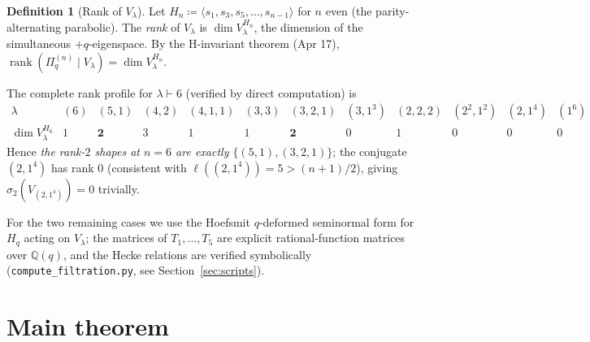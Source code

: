 \documentclass[11pt]{article}
\theoremstyle{plain}
\theoremstyle{definition}
\newtheorem{definition}[theorem]{Definition}
\theoremstyle{remark}
\newcommand{\Q}{\mathbb{Q}}
\newcommand{\Hq}{H_q}
\newcommand{\Pibs}{\Pi_q}
\begin{document}
\begin{definition}[Rank of $V_\lambda$]
Let $H_n \coloneqq \langle s_1,s_3,s_5,\ldots,s_{n-1}\rangle$ for $n$ even
(the parity-alternating parabolic). The \emph{rank} of $V_\lambda$ is
$\dim V_\lambda^{H_n}$, the dimension of the simultaneous $+q$-eigenspace.
By the H-invariant theorem (Apr 17), $\operatorname{rank}(\Pibs^{(n)} \mid V_\lambda) = \dim V_\lambda^{H_n}$.
\end{definition}

The complete rank profile for $\lambda \vdash 6$ (verified by direct
computation) is
\[
\begin{array}{c|ccccccccccc}
\lambda & (6) & (5,1) & (4,2) & (4,1,1) & (3,3) & (3,2,1) & (3,1^3) & (2,2,2) & (2^2,1^2) & (2,1^4) & (1^6) \\
\hline
\dim V_\lambda^{H_6} & 1 & \mathbf{2} & 3 & 1 & 1 & \mathbf{2} & 0 & 1 & 0 & 0 & 0
\end{array}
\]
Hence \emph{the rank-$2$ shapes at $n=6$ are exactly $\{(5,1), (3,2,1)\}$};
the conjugate $(2,1^4)$ has rank $0$ (consistent with $\ell((2,1^4)) = 5 > (n+1)/2$),
giving $\sigma_2(V_{(2,1^4)}) = 0$ trivially.

For the two remaining cases we use the Hoefsmit $q$-deformed seminormal
form for $\Hq$ acting on $V_\lambda$; the matrices of $T_1,\ldots,T_5$
are explicit rational-function matrices over $\Q(q)$, and the Hecke
relations are verified symbolically (\verb|compute_filtration.py|, see
Section~\ref{sec:scripts}).

\section{Main theorem}
\end{document}
